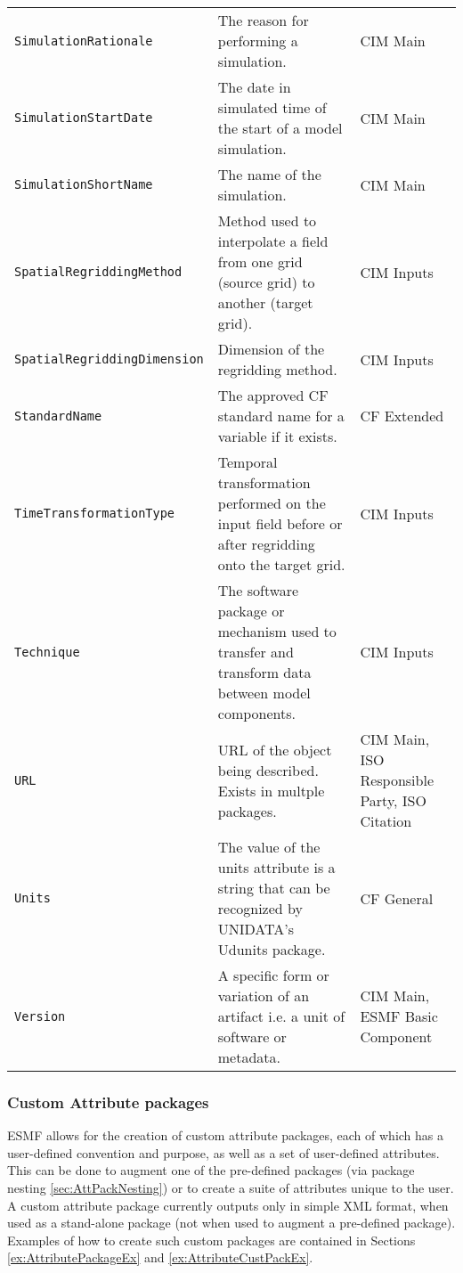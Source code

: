 \begin{longtable}{|p{7cm}|p{5cm}|p{15mm}|}
     {\tt SimulationRationale} & The reason for performing a simulation. & CIM Main\\
     {\tt SimulationStartDate} & The date in simulated time of the start of a model simulation. & CIM Main\\ 
     {\tt SimulationShortName} & The name of the simulation. & CIM Main\\
     {\tt SpatialRegriddingMethod} & Method used to interpolate a field from one grid (source grid) to another (target grid). & CIM Inputs\\ 
     {\tt SpatialRegriddingDimension} & Dimension of the regridding method. & CIM Inputs\\
     {\tt StandardName} & The approved CF standard name for a variable if it exists. &  CF Extended\\
     {\tt TimeTransformationType} & Temporal transformation performed on the input field before or after regridding onto the target grid.& CIM Inputs\\ 
     {\tt Technique} & The software package or mechanism used to transfer and transform data between model components. & CIM Inputs\\ 
     {\tt URL} & URL of the object being described. Exists in multple packages. & CIM Main, ISO Responsible Party, ISO Citation\\
     {\tt Units}  & The value of the units attribute is a string that can be recognized by UNIDATA's Udunits package. & CF General\\
     {\tt Version} & A specific form or variation of an artifact i.e. a unit of software or metadata. & CIM Main, ESMF Basic Component\\ 
\hline\hline
\end{longtable}

\vspace{.20in}

\subsubsection{Custom Attribute packages}
\label{sec:CustomAttPacks}

ESMF allows for the creation of custom attribute packages, each of which has a user-defined convention and purpose, as well as a set of user-defined attributes. This can be done to augment one of the pre-defined packages (via package nesting \ref{sec:AttPackNesting}) or to create a suite of attributes unique to the user. A custom attribute package currently outputs only in simple XML format, when used as a stand-alone package (not when used to augment a pre-defined package).  Examples of how to create such custom packages are contained in Sections \ref{ex:AttributePackageEx} and \ref{ex:AttributeCustPackEx}.
